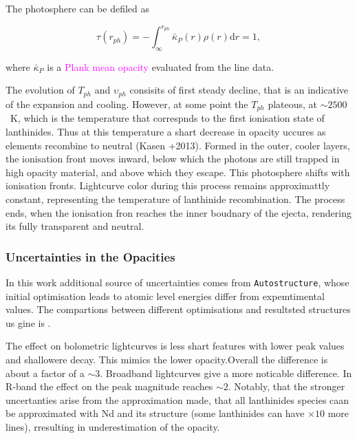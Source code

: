 \documentclass[11pt,a4paper,headinclude=true,DIV=14,BCOR=8mm,chapterprefix,listof=totoc,twoside,openright,abstracton]{scrbook}
\newcommand{\magenta}[1]{\textcolor{magenta}{#1}} %
\begin{document}
The photosphere can be defiled as 

\begin{equation}
    \tau(r_{ph}) = -\int_{\infty}^{r_{ph}} \bar{\kappa}_{P}(r)\rho(r)\text{d}r = 1,
\end{equation}

where $\bar{\kappa}_P$ is a \magenta{Plank mean opacity} evaluated from the line data.

The evolution of $T_{ph}$ and $\upsilon_{ph}$ consisits of first steady decline, that is an indicative of the expansion and cooling. However, at some point the $T_{ph}$ plateous, at $\sim2500$~K, which is the temperature that correspnds to the first ionisation state of lanthinides. Thus at this temperature a shart decrease in opacity uccures as elements recombine to neutral (Kasen +2013). 
Formed in the outer, cooler layers, the ionisation front moves inward, below which the photons are still trapped in high opacity material, and above which they escape. This photosphere shifts with ionisation fronts. Lightcurve color during this process remains approximattly constant, representing the temperature of lanthinide recombination. The process ends, when the ionisation fron reaches the inner boudnary of the ejecta, rendering its fully transparent and neutral. 


\subsubsection{Uncertainties in the Opacities}

In this work additional source of uncertainties comes from \texttt{Autostructure}, whose initial optimisation leads to atomic level energies differ from expemtimental values. The compartions between different optimisations and resultsted structures us gine is \cite{Kasen et al 2013}.

The effect on bolometric lightcurves is less shart features with lower peak values and shallowere decay. This mimics the lower opacity.Overall the difference is about a factor of a $\sim 3$. Broadband lightcurves give a more noticable difference. In R-band the effect on the peak magnitude reaches $\sim 2$. 
Notably, that the stronger uncertanties arise from the approximation made, that all lanthinides species caan be approximated with Nd and its structure (some lanthinides can have $\times 10$ more lines), rresulting in underestimation of the opacity. 

\end{document}
